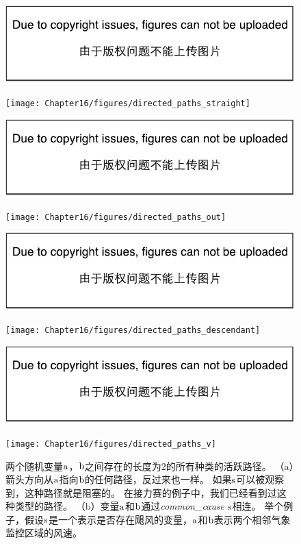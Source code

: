 \begin{figure}[!htb]
	\ifOpenSource
	\centerline{\includegraphics{figure.pdf}}
	\else
	\centerline{\texttt{[image: Chapter16/figures/directed\_paths\_straight]}}	
	\fi
	\ifOpenSource
	\centerline{\includegraphics{figure.pdf}}
	\else
	\centerline{\texttt{[image: Chapter16/figures/directed\_paths\_out]}}
	\fi
	\ifOpenSource
	\centerline{\includegraphics{figure.pdf}}
	\else
	\centerline{\texttt{[image: Chapter16/figures/directed\_paths\_descendant]}}
	\fi
	\ifOpenSource
	\centerline{\includegraphics{figure.pdf}}
	\else
	\centerline{\texttt{[image: Chapter16/figures/directed\_paths\_v]}}		
	\fi
\caption{两个随机变量$\mathrm{a}$，$\mathrm{b}$之间存在的长度为$2$的所有种类的活跃路径。
（a）箭头方向从$\mathrm{a}$指向$\mathrm{b}$的任何路径，反过来也一样。
如果$\mathrm{s}$可以被观察到，这种路径就是阻塞的。
在接力赛的例子中，我们已经看到过这种类型的路径。
（b）变量$\mathrm{a}$和$\mathrm{b}$通过\emph{\gls{common_cause}} $\mathrm{s}$相连。
举个例子，假设$\mathrm{s}$是一个表示是否存在飓风的变量，$\mathrm{a}$和$\mathrm{b}$表示两个相邻气象监控区域的风速。
}
\end{figure}
